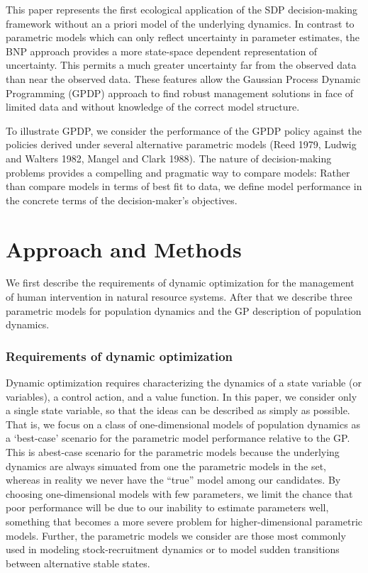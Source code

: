 \documentclass[author-year, 12pt,review]{elsarticle} %
\begin{document}
This paper represents the first ecological application of the SDP
decision-making framework without an a priori model of the underlying
dynamics. In contrast to parametric models which can only reflect
uncertainty in parameter estimates, the BNP approach provides a more
state-space dependent representation of uncertainty. This permits a much
greater uncertainty far from the observed data than near the observed
data. These features allow the Gaussian Process Dynamic Programming
(GPDP) approach to find robust management solutions in face of limited
data and without knowledge of the correct model structure.

To illustrate GPDP, we consider the performance of the GPDP policy
against the policies derived under several alternative parametric models
(Reed 1979, Ludwig and Walters 1982, Mangel and Clark 1988). The nature
of decision-making problems provides a compelling and pragmatic way to
compare models: Rather than compare models in terms of best fit to data,
we define model performance in the concrete terms of the
decision-maker's objectives.

\section{Approach and Methods}\label{approach-and-methods}

We first describe the requirements of dynamic optimization for the
management of human intervention in natural resource systems. After that
we describe three parametric models for population dynamics and the GP
description of population dynamics.

\subsubsection{Requirements of dynamic
optimization}\label{requirements-of-dynamic-optimization}

Dynamic optimization requires characterizing the dynamics of a state
variable (or variables), a control action, and a value function. In this
paper, we consider only a single state variable, so that the ideas can
be described as simply as possible. That is, we focus on a class of
one-dimensional models of population dynamics as a `best-case' scenario
for the parametric model performance relative to the GP. This is
abest-case scenario for the parametric models because the underlying
dynamics are always simuated from one the parametric models in the set,
whereas in reality we never have the ``true'' model among our
candidates. By choosing one-dimensional models with few parameters, we
limit the chance that poor performance will be due to our inability to
estimate parameters well, something that becomes a more severe problem
for higher-dimensional parametric models. Further, the parametric models
we consider are those most commonly used in modeling stock-recruitment
dynamics or to model sudden transitions between alternative stable
states.
\end{document}
